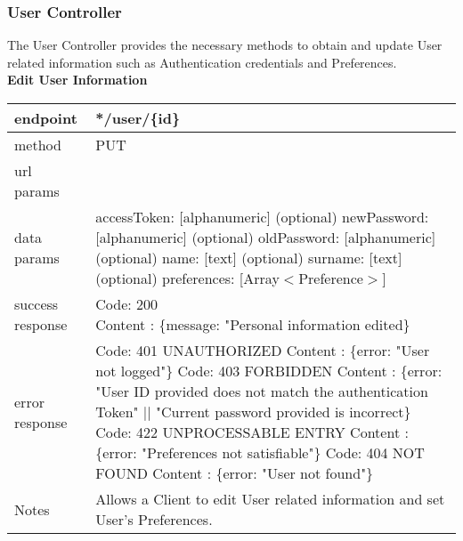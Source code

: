 \subsubsection*{User Controller}
The User Controller provides the necessary methods to obtain and update User related information such as Authentication credentials and Preferences.\\

\textbf{Edit User Information}

\begin{tabularx}{\linewidth}{| l | l |}
	\hline
	endpoint & */user/\{id\} \\
	\hline
	method & PUT \\
	\hline
	url params & \\
	\hline
	data params & 
	\parbox{0.7\textwidth}{
		\bigskip
		accessToken: [alphanumeric] \\
		(optional) newPassword: [alphanumeric]\\
		(optional) oldPassword:
		[alphanumeric]\\
		(optional) name: [text]\\
		(optional) surname: [text]\\
		(optional) preferences: [Array$<$Preference$>$]
		\bigskip
	} \\
	\hline
	success response &
	\parbox{0.7\textwidth}{
		\bigskip
		Code: 200\\
		Content : \{message: "Personal information edited\}
		\bigskip
	} \\
	\hline
	error response &
	\parbox{0.7\textwidth}{
		\bigskip
		Code: 401 UNAUTHORIZED \\
		Content : \{error: "User not logged"\}\\
		Code: 403 FORBIDDEN \\
		Content : \{error: "User ID provided does not match the authentication Token" $||$ "Current password provided is incorrect\}\\
		Code: 422 UNPROCESSABLE ENTRY \\
		Content : \{error: "Preferences not satisfiable"\}\\
		Code: 404 NOT FOUND \\
		Content : \{error: "User not found"\}
		\bigskip
	} \\
	\hline
	Notes & \parbox{0.7\textwidth}{
		\bigskip
		Allows a Client to edit User related information and set User's Preferences.
		\bigskip
	} \\
	\hline
\end{tabularx}

